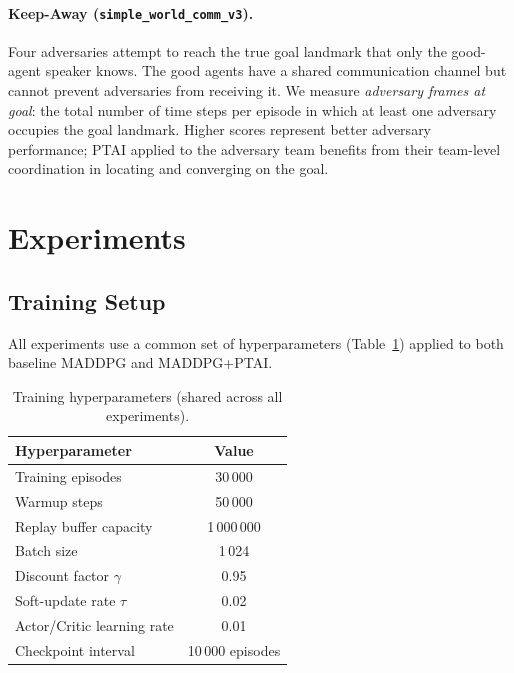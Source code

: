 \documentclass[12pt]{article}
\begin{document}
\paragraph{Keep-Away (\texttt{simple\_world\_comm\_v3}).}
Four adversaries attempt to reach the true goal landmark that only the good-agent speaker
knows. The good agents have a shared communication channel but cannot prevent adversaries
from receiving it. We measure \emph{adversary frames at goal}: the total number of
time steps per episode in which at least one adversary occupies the goal landmark.
Higher scores represent better adversary performance; PTAI applied to the adversary team
benefits from their team-level coordination in locating and converging on the goal.

\section{Experiments}

\subsection{Training Setup}

All experiments use a common set of hyperparameters (Table~\ref{tab:hparams}) applied to
both baseline MADDPG and MADDPG+PTAI.

\begin{table}[H]
\centering
\caption{Training hyperparameters (shared across all experiments).}
\label{tab:hparams}
\begin{tabular}{lc}
\toprule
Hyperparameter & Value \\
\midrule
Training episodes     & 30\,000 \\
Warmup steps          & 50\,000 \\
Replay buffer capacity & 1\,000\,000 \\
Batch size            & 1\,024 \\
Discount factor $\gamma$ & 0.95 \\
Soft-update rate $\tau$ & 0.02 \\
Actor/Critic learning rate & 0.01 \\
Checkpoint interval   & 10\,000 episodes \\
\bottomrule
\end{tabular}
\end{table}
\end{document}
